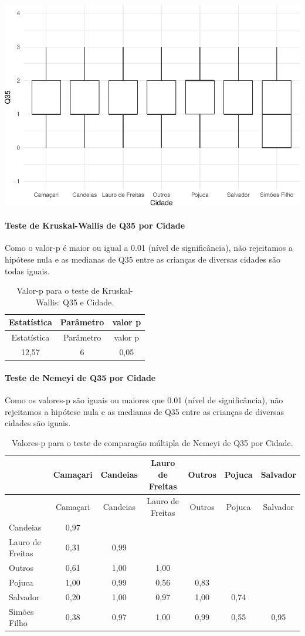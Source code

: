 \documentclass[]{article}
\let\oldparagraph\paragraph
\renewcommand{\paragraph}[1]{\oldparagraph{#1}\mbox{}}
\begin{document}
\begin{center}\includegraphics[width=0.75\linewidth]{relatorio_covid19_files/figure-latex/unnamed-chunk-1257-1} \end{center}

\hypertarget{teste-de-kruskal-wallis-de-q35-por-cidade}{%
\paragraph{Teste de Kruskal-Wallis de Q35 por Cidade}\label{teste-de-kruskal-wallis-de-q35-por-cidade}}

Como o valor-p é maior ou igual a 0.01 (nível de significância), não rejeitamos a hipótese nula e as medianas de Q35 entre as crianças de diversas cidades são todas iguais.

\begin{longtable}[]{@{}ccc@{}}
\caption{\label{tab:unnamed-chunk-1259}Valor-p para o teste de Kruskal-Wallis: Q35 e Cidade.}\tabularnewline
\toprule
Estatística & Parâmetro & valor p\tabularnewline
\midrule
\endfirsthead
\toprule
Estatística & Parâmetro & valor p\tabularnewline
\midrule
\endhead
12,57 & 6 & 0,05\tabularnewline
\bottomrule
\end{longtable}

\hypertarget{teste-de-nemeyi-de-q35-por-cidade}{%
\paragraph{Teste de Nemeyi de Q35 por Cidade}\label{teste-de-nemeyi-de-q35-por-cidade}}

Como os valores-p são iguais ou maiores que 0.01 (nível de significância), não rejeitamos a hipótese nula e as medianas de Q35 entre as crianças de diversas cidades são iguais.

\begin{longtable}[]{@{}lcccccc@{}}
\caption{\label{tab:unnamed-chunk-1261}Valores-p para o teste de comparação múltipla de Nemeyi de Q35 por Cidade.}\tabularnewline
\toprule
& Camaçari & Candeias & Lauro de Freitas & Outros & Pojuca & Salvador\tabularnewline
\midrule
\endfirsthead
\toprule
& Camaçari & Candeias & Lauro de Freitas & Outros & Pojuca & Salvador\tabularnewline
\midrule
\endhead
Candeias & 0,97 & & & & &\tabularnewline
Lauro de Freitas & 0,31 & 0,99 & & & &\tabularnewline
Outros & 0,61 & 1,00 & 1,00 & & &\tabularnewline
Pojuca & 1,00 & 0,99 & 0,56 & 0,83 & &\tabularnewline
Salvador & 0,20 & 1,00 & 0,97 & 1,00 & 0,74 &\tabularnewline
Simões Filho & 0,38 & 0,97 & 1,00 & 0,99 & 0,55 & 0,95\tabularnewline
\bottomrule
\end{longtable}
\end{document}
